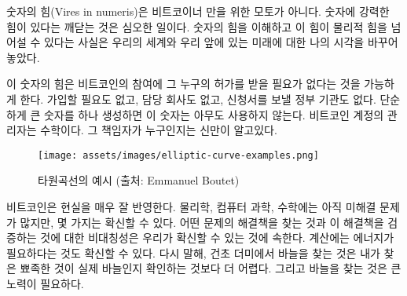 \begin{comment}
\textit{Vires in numeris} is not only a catchy motto used by bitcoiners. The
realization that there is an unfathomable strength to be found in
numbers is a profound one. Understanding this, and the inversion of
existing power balances which it enables changed my view of the world
and the future which lies ahead of us.
\end{comment}
숫자의 힘(Vires in numeris)은 비트코이너 만을 위한 모토가 아니다.
숫자에 강력한 힘이 있다는 깨닫는 것은 심오한 일이다.
숫자의 힘을 이해하고 이 힘이 물리적 힘을 넘어설 수 있다는 사실은 
우리의 세계와 우리 앞에 있는 미래에 대한 나의 시각을 바꾸어 놓았다.

\begin{comment}
	One direct result of this is the fact that you don't have to ask anyone for permission to participate in Bitcoin. 
	There is no page to sign up, no company in charge, no government agency to send application forms to.
	Simply generate a large number and you are pretty much good to go. 
	The central authority of account creation is mathematics. And God only knows who is in charge of that.
\end{comment}
이 숫자의 힘은 비트코인의 참여에 그 누구의 허가를 받을 필요가 없다는 것을 가능하게 한다.
가입할 필요도 없고, 담당 회사도 없고, 신청서를 보낼 정부 기관도 없다.
단순하게 큰 숫자를 하나 생성하면 이 숫자는 아무도 사용하지 않는다.
비트코인 계정의 관리자는 수학이다. 그 책임자가 누구인지는 신만이 알고있다.

\begin{figure}
  \texttt{[image: assets/images/elliptic-curve-examples.png]}
  \caption{타원곡선의 예시 (출처: Emmanuel Boutet)}
  \label{fig:elliptic-curve-examples}
\end{figure}

\begin{comment}
Bitcoin is built upon our best understanding of reality. While there are
still many open problems in physics, computer science, and mathematics,
we are pretty sure about some things. That there is an asymmetry between
finding solutions and validating the correctness of these solutions is
one such thing. That computation needs energy is another one. In other
words: finding a needle in a haystack is harder than checking if the
pointy thing in your hand is indeed a needle or not. And finding the
needle takes work.
\end{comment}
비트코인은 현실을 매우 잘 반영한다.
물리학, 컴퓨터 과학, 수학에는 아직 미해결 문제가 많지만, 몇 가지는 확신할 수 있다.
어떤 문제의 해결책을 찾는 것과 이 해결책을 검증하는 것에 대한 비대칭성은 우리가 확신할 수 있는 것에 속한다.
계산에는 에너지가 필요하다는 것도 확신할 수 있다. 
다시 말해, 건초 더미에서 바늘을 찾는 것은 내가 찾은 뾰족한 것이 실제 바늘인지 확인하는 것보다 더 어렵다. 
그리고 바늘을 찾는 것은 큰 노력이 필요하다.

